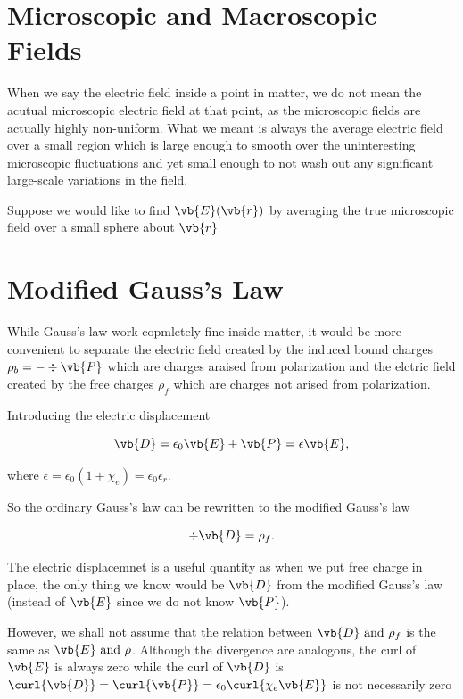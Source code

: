 \documentclass[english,a4paper,12pt]{report}
\begin{document}
\section{Microscopic and Macroscopic Fields}

When we say the electric field inside a point in matter, we do not mean the acutual microscopic electric field at that point, as the microscopic fields are actually highly non-uniform. What we meant is always the average electric field over a small region which is large enough to smooth over the uninteresting microscopic fluctuations and yet small enough to not wash out any significant large-scale variations in the field. 

Suppose we would like to find \(\vb{E} (\vb{r} )\) by averaging the true microscopic field over a small sphere about \(\vb{r} \) 

\section{Modified Gauss's Law}

While Gauss's law work copmletely fine inside matter, it would be more convenient to separate the electric field created by the induced bound charges \(\rho _{b} = -\div{\vb{P} } \) which are charges araised from polarization and the elctric field created by the free charges \(\rho _{f} \) which are charges not arised from polarization.

Introducing the electric displacement 

\begin{equation}
    \vb{D} = \epsilon _{0}\vb{E} + \vb{P} = \epsilon \vb{E}  ,  
\end{equation}

where \(\epsilon = \epsilon _{0}(1 + \chi _{e} ) = \epsilon _{0}\epsilon _{r}   \). 

So the ordinary Gauss's law can be rewritten to the modified Gauss's law

\begin{equation}
    \div{\vb{D} } = \rho _{f}. 
\end{equation}

The electric displacemnet is a useful quantity as when we put free charge in place, the only thing we know would be \(\vb{D} \) from the modified Gauss's law (instead of \(\vb{E} \) since we do not know \(\vb{P} \)).

However, we shall not assume that the relation between \(\vb{D} \text { and } \rho _{f} \) is the same as \(\vb{E} \text { and } \rho \). Although the divergence are analogous, the curl of \(\vb{E} \) is always zero while the curl of \(\vb{D} \) is \(\curl{\vb{D} } = \curl{\vb{P} } = \epsilon _{0}  \curl{\chi _{e} \vb{E} }  \) is not necessarily zero
\end{document}
